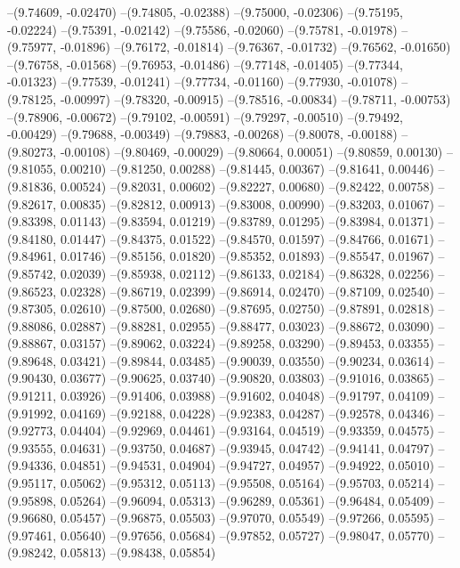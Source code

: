 --(9.74609, -0.02470)
--(9.74805, -0.02388)
--(9.75000, -0.02306)
--(9.75195, -0.02224)
--(9.75391, -0.02142)
--(9.75586, -0.02060)
--(9.75781, -0.01978)
--(9.75977, -0.01896)
--(9.76172, -0.01814)
--(9.76367, -0.01732)
--(9.76562, -0.01650)
--(9.76758, -0.01568)
--(9.76953, -0.01486)
--(9.77148, -0.01405)
--(9.77344, -0.01323)
--(9.77539, -0.01241)
--(9.77734, -0.01160)
--(9.77930, -0.01078)
--(9.78125, -0.00997)
--(9.78320, -0.00915)
--(9.78516, -0.00834)
--(9.78711, -0.00753)
--(9.78906, -0.00672)
--(9.79102, -0.00591)
--(9.79297, -0.00510)
--(9.79492, -0.00429)
--(9.79688, -0.00349)
--(9.79883, -0.00268)
--(9.80078, -0.00188)
--(9.80273, -0.00108)
--(9.80469, -0.00029)
--(9.80664, 0.00051)
--(9.80859, 0.00130)
--(9.81055, 0.00210)
--(9.81250, 0.00288)
--(9.81445, 0.00367)
--(9.81641, 0.00446)
--(9.81836, 0.00524)
--(9.82031, 0.00602)
--(9.82227, 0.00680)
--(9.82422, 0.00758)
--(9.82617, 0.00835)
--(9.82812, 0.00913)
--(9.83008, 0.00990)
--(9.83203, 0.01067)
--(9.83398, 0.01143)
--(9.83594, 0.01219)
--(9.83789, 0.01295)
--(9.83984, 0.01371)
--(9.84180, 0.01447)
--(9.84375, 0.01522)
--(9.84570, 0.01597)
--(9.84766, 0.01671)
--(9.84961, 0.01746)
--(9.85156, 0.01820)
--(9.85352, 0.01893)
--(9.85547, 0.01967)
--(9.85742, 0.02039)
--(9.85938, 0.02112)
--(9.86133, 0.02184)
--(9.86328, 0.02256)
--(9.86523, 0.02328)
--(9.86719, 0.02399)
--(9.86914, 0.02470)
--(9.87109, 0.02540)
--(9.87305, 0.02610)
--(9.87500, 0.02680)
--(9.87695, 0.02750)
--(9.87891, 0.02818)
--(9.88086, 0.02887)
--(9.88281, 0.02955)
--(9.88477, 0.03023)
--(9.88672, 0.03090)
--(9.88867, 0.03157)
--(9.89062, 0.03224)
--(9.89258, 0.03290)
--(9.89453, 0.03355)
--(9.89648, 0.03421)
--(9.89844, 0.03485)
--(9.90039, 0.03550)
--(9.90234, 0.03614)
--(9.90430, 0.03677)
--(9.90625, 0.03740)
--(9.90820, 0.03803)
--(9.91016, 0.03865)
--(9.91211, 0.03926)
--(9.91406, 0.03988)
--(9.91602, 0.04048)
--(9.91797, 0.04109)
--(9.91992, 0.04169)
--(9.92188, 0.04228)
--(9.92383, 0.04287)
--(9.92578, 0.04346)
--(9.92773, 0.04404)
--(9.92969, 0.04461)
--(9.93164, 0.04519)
--(9.93359, 0.04575)
--(9.93555, 0.04631)
--(9.93750, 0.04687)
--(9.93945, 0.04742)
--(9.94141, 0.04797)
--(9.94336, 0.04851)
--(9.94531, 0.04904)
--(9.94727, 0.04957)
--(9.94922, 0.05010)
--(9.95117, 0.05062)
--(9.95312, 0.05113)
--(9.95508, 0.05164)
--(9.95703, 0.05214)
--(9.95898, 0.05264)
--(9.96094, 0.05313)
--(9.96289, 0.05361)
--(9.96484, 0.05409)
--(9.96680, 0.05457)
--(9.96875, 0.05503)
--(9.97070, 0.05549)
--(9.97266, 0.05595)
--(9.97461, 0.05640)
--(9.97656, 0.05684)
--(9.97852, 0.05727)
--(9.98047, 0.05770)
--(9.98242, 0.05813)
--(9.98438, 0.05854)
